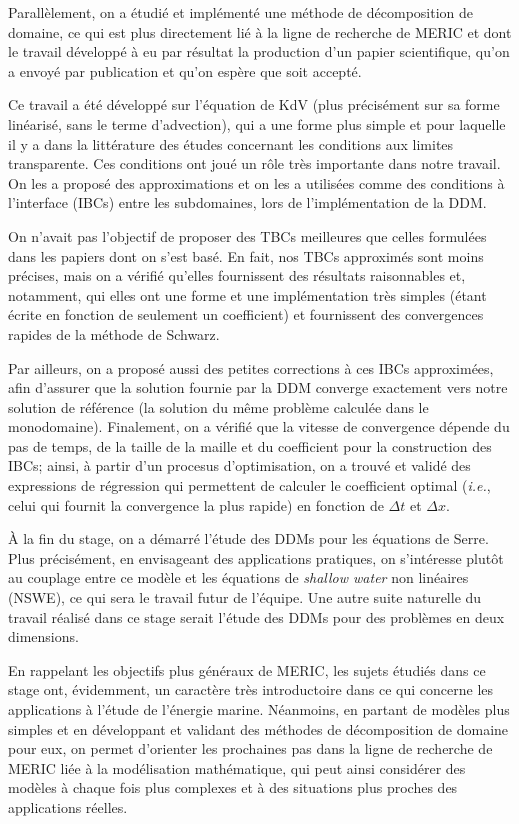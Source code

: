 \indent Parallèlement, on a étudié et implémenté une méthode de décomposition de domaine, ce qui est plus directement lié à la ligne de recherche de MERIC et dont le travail développé à eu par résultat la production d'un papier scientifique, qu'on a envoyé par publication et qu'on espère que soit accepté.

\indent Ce travail a été développé sur l'équation de KdV (plus précisément sur sa forme linéarisé, sans le terme d'advection), qui a une forme plus simple et pour laquelle il y a dans la littérature des études concernant les conditions aux limites transparente. Ces conditions ont joué un rôle très importante dans notre travail. On les a proposé des approximations et on les a utilisées comme des conditions à l'interface (IBCs) entre les subdomaines, lors de l'implémentation de la DDM.

\indent On n'avait pas l'objectif de proposer des TBCs meilleures que celles formulées dans les papiers dont on s'est basé. En fait, nos TBCs approximés sont moins précises, mais on a vérifié qu'elles fournissent des résultats raisonnables et, notamment, qui elles ont une forme et une implémentation très simples (étant écrite en fonction de seulement un coefficient) et fournissent des convergences rapides de la méthode de Schwarz.

\indent Par ailleurs, on a proposé aussi des petites corrections à ces IBCs approximées, afin d'assurer que la solution fournie par la DDM converge exactement vers notre solution de référence (la solution du même problème calculée dans le monodomaine). Finalement, on a vérifié que la vitesse de convergence dépende du pas de temps, de la taille de la maille et du coefficient pour la construction des IBCs; ainsi, à partir d'un procesus d'optimisation, on a trouvé et validé des expressions de régression qui permettent de calculer le coefficient optimal (\emph{i.e.}, celui qui fournit la convergence la plus rapide) en fonction de $\Delta t $ et $\Delta x$.

\indent À la fin du stage, on a démarré l'étude des DDMs pour les équations de Serre. Plus précisément, en envisageant des applications pratiques, on s'intéresse plutôt au couplage entre ce modèle et les équations de \emph{shallow water} non linéaires (NSWE), ce qui sera le travail futur de l'équipe. Une autre suite naturelle du travail réalisé dans ce stage serait l'étude des DDMs pour des problèmes en deux dimensions.

\indent En rappelant les objectifs plus généraux de MERIC, les sujets étudiés dans ce stage ont, évidemment, un caractère très introductoire dans ce qui concerne les applications à l'étude de l'énergie marine. Néanmoins, en partant de modèles plus simples et en développant et validant des méthodes de décomposition de domaine pour eux, on permet d'orienter les prochaines pas dans la ligne de recherche de MERIC liée à la modélisation mathématique, qui peut ainsi considérer des modèles à chaque fois plus complexes et à des situations plus proches des applications réelles.